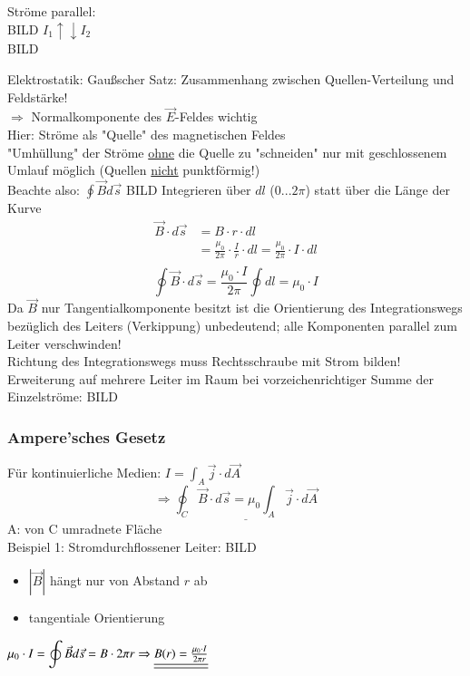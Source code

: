 Ströme parallel:\\
BILD
$ I_1 \uparrow\downarrow I_2 $ \\
BILD

Elektrostatik: Gaußscher Satz: Zusammenhang zwischen Quellen-Verteilung und Feldstärke! \\
\indent $ \Rightarrow $ Normalkomponente des $ \vec{E} $-Feldes wichtig\\
Hier: Ströme als "Quelle" des magnetischen Feldes \\
"Umhüllung" der Ströme \underline{ohne} die Quelle zu "schneiden" nur mit geschlossenem Umlauf möglich (Quellen \underline{nicht} punktförmig!)\\
Beachte also: $ \displaystyle \oint\vec{B}d\vec{s} $
BILD
Integrieren über $ dl $ ($ 0...2\pi $) statt über die Länge der Kurve \\
\begin{align*}
\vec{B} \cdot d\vec{s} &= B \cdot r \cdot dl\\
&= \frac{\mu_0}{2\pi} \cdot \frac{I}{r} \cdot dl = \frac{\mu_0}{2\pi} \cdot I \cdot dl \\
\end{align*}
$$ \boxed{{\displaystyle \oint \vec{B}\cdot d\vec{s} = \frac{\mu_0 \cdot I}{2\pi} \oint dl = \mu_0 \cdot I}} $$
Da $ \vec{B} $ nur Tangentialkomponente besitzt ist die Orientierung des Integrationswegs bezüglich des Leiters (Verkippung) unbedeutend; alle Komponenten parallel zum Leiter verschwinden!\\
Richtung des Integrationswegs muss Rechtsschraube mit Strom bilden!\\
Erweiterung auf mehrere Leiter im Raum bei vorzeichenrichtiger Summe der Einzelströme:
BILD
\subsubsection{Ampere'sches Gesetz}
Für kontinuierliche Medien: $ I = {\displaystyle \int_A \vec{j}\cdot d\vec{A}} $\\
$$ \Rightarrow\underline{{\displaystyle\oint_C \vec{B}\cdot d\vec{s} = \mu_0\int_A \vec{j} \cdot d\vec{A}}} $$
A: von C umradnete Fläche\\
\break
Beispiel 1: Stromdurchflossener Leiter:
BILD
\begin{itemize}
	\item $ |\vec{B}| $ hängt nur von Abstand $ r $ ab
	\item tangentiale Orientierung
\end{itemize}
\begin{math}
\mu_0 \cdot I = {\displaystyle\oint\vec{B}d\vec{s}} = B \cdot 2\pi r\\
\Rightarrow \underline{\underline{B(r) = \frac{\mu_0 \cdot I }{2\pi r}}}
\end{math}

